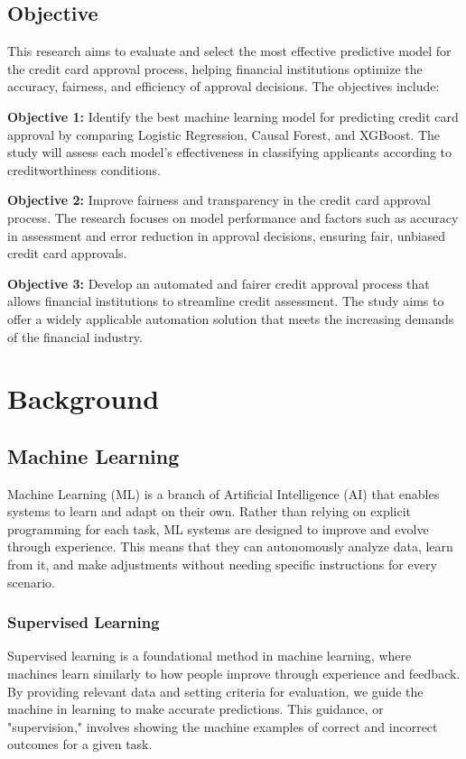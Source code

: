 \documentclass[12pt]{report}
\begin{document}
    \section{Objective}
    This research aims to evaluate and select the most effective predictive model for the credit card approval process, helping financial institutions optimize the accuracy, fairness, and efficiency of approval decisions. The objectives include:

    {\bfseries Objective 1:} Identify the best machine learning model for predicting credit card approval by comparing Logistic Regression, Causal Forest, and XGBoost. The study will assess each model's effectiveness in classifying applicants according to creditworthiness conditions.

    {\bfseries Objective 2:} Improve fairness and transparency in the credit card approval process. The research focuses on model performance and factors such as accuracy in assessment and error reduction in approval decisions, ensuring fair, unbiased credit card approvals.

    {\bfseries Objective 3:} Develop an automated and fairer credit approval process that allows financial institutions to streamline credit assessment. The study aims to offer a widely applicable automation solution that meets the increasing demands of the financial industry.

    \chapter{Background}
    
    \section{Machine Learning}
    Machine Learning (ML) is a branch of Artificial Intelligence (AI) that enables systems to learn and adapt on their own. Rather than relying on explicit programming for each task, ML systems are designed to improve and evolve through experience. This means that they can autonomously analyze data, learn from it, and make adjustments without needing specific instructions for every scenario.

    \subsection{Supervised Learning}
    Supervised learning is a foundational method in machine learning, where machines learn similarly to how people improve through experience and feedback. By providing relevant data and setting criteria for evaluation, we guide the machine in learning to make accurate predictions. This guidance, or "supervision," involves showing the machine examples of correct and incorrect outcomes for a given task.
\end{document}
